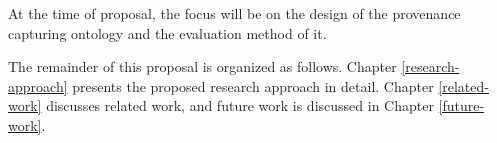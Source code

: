 At the time of proposal, the focus will be on the design of the provenance capturing ontology and the evaluation method of it.

The remainder of this proposal is organized as follows. Chapter \ref{research-approach} presents the proposed research approach in detail. 
Chapter \ref{related-work} discusses related work,
and future work is discussed in Chapter \ref{future-work}.

